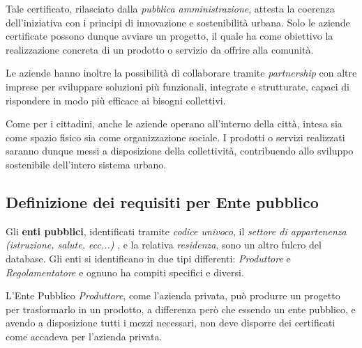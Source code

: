 \documentclass{article}
\begin{document}
\par\vspace{0.3cm}

Tale certificato, rilasciato dalla \textit{pubblica amministrazione}, attesta la coerenza dell’iniziativa con i principi di innovazione e sostenibilità urbana. Solo le aziende certificate possono dunque avviare un progetto, il quale ha come obiettivo la realizzazione concreta di un prodotto o servizio da offrire alla comunità.

\par\vspace{0.3cm}

Le aziende hanno inoltre la possibilità di collaborare tramite \textit{partnership} con altre imprese per sviluppare soluzioni più funzionali, integrate e strutturate, capaci di rispondere in modo più efficace ai bisogni collettivi.

\par\vspace{0.3cm}

Come per i cittadini, anche le aziende operano all’interno della città, intesa sia come spazio fisico sia come organizzazione sociale. I prodotti o servizi realizzati saranno dunque messi a disposizione della collettività, contribuendo allo sviluppo sostenibile dell’intero sistema urbano.


\subsection{Definizione dei requisiti per Ente pubblico}

Gli \textbf{enti pubblici}, identificati tramite \textit{codice univoco}, il \textit{settore di appartenenza (istruzione, salute, ecc...) }, e la relativa \textit{residenza}, sono un altro fulcro del database. Gli enti si identificano in due tipi differenti: \textit{Produttore} e \textit{Regolamentatore} e ognuno ha compiti specifici e diversi. 

\par\vspace{0.3cm}

L'Ente Pubblico \textit{Produttore}, come l'azienda privata, può produrre un progetto per trasformarlo in un prodotto, a differenza però che essendo un ente pubblico, e avendo a disposizione tutti i mezzi necessari, non deve disporre dei certificati come accadeva per l'azienda privata.
\end{document}
